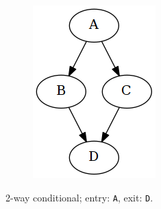 \begin{figure}[htbp]
\begin{subfigure}[ht]{0.23\textwidth}
	\end{subfigure}
	\qquad
	\begin{subfigure}[ht]{0.28\textwidth}
		\centering
		\begin{subfigure}[ht]{0.45\textwidth}
			
		\end{subfigure}
		\begin{subfigure}[ht]{0.50\textwidth}
			\includegraphics[width=\textwidth]{inc/primitives/if_else.png}
		\end{subfigure}
		\caption{2-way conditional; entry: \texttt{A}, exit: \texttt{D}.}
	\end{subfigure}
	\qquad
	\begin{subfigure}[ht]{0.30\textwidth}
		\centering
		\begin{subfigure}[ht]{0.45\textwidth}
			

\end{subfigure}
\end{subfigure}
\end{figure}
